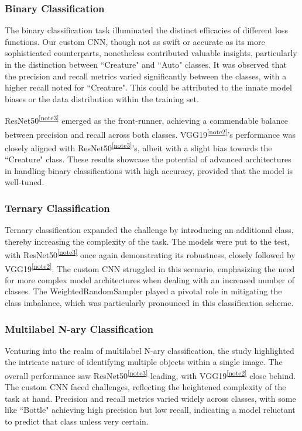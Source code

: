 \documentclass{article} %
\begin{document}
\subsubsection{Binary Classification}
The binary classification task illuminated the distinct efficacies of different loss functions. Our custom CNN, though not as swift or accurate as its more sophisticated counterparts, nonetheless contributed valuable insights, particularly in the distinction between ``Creature" and ``Auto" classes. It was observed that the precision and recall metrics varied significantly between the classes, with a higher recall noted for ``Creature". This could be attributed to the innate model biases or the data distribution within the training set.


ResNet50\textsuperscript{\ref{note3}} emerged as the front-runner, achieving a commendable balance between precision and recall across both classes. VGG19\textsuperscript{\ref{note2}}'s performance was closely aligned with ResNet50\textsuperscript{\ref{note3}}'s, albeit with a slight bias towards the ``Creature" class. These results showcase the potential of advanced architectures in handling binary classifications with high accuracy, provided that the model is well-tuned.


\subsubsection{Ternary Classification}
Ternary classification expanded the challenge by introducing an additional class, thereby increasing the complexity of the task. The models were put to the test, with ResNet50\textsuperscript{\ref{note3}} once again demonstrating its robustness, closely followed by VGG19\textsuperscript{\ref{note2}}. The custom CNN struggled in this scenario, emphasizing the need for more complex model architectures when dealing with an increased number of classes. The WeightedRandomSampler played a pivotal role in mitigating the class imbalance, which was particularly pronounced in this classification scheme.


\subsubsection{Multilabel N-ary Classification}
Venturing into the realm of multilabel N-ary classification, the study highlighted the intricate nature of identifying multiple objects within a single image. The overall performance saw ResNet50\textsuperscript{\ref{note3}} leading, with VGG19\textsuperscript{\ref{note2}} close behind. The custom CNN faced challenges, reflecting the heightened complexity of the task at hand. Precision and recall metrics varied widely across classes, with some like ``Bottle" achieving high precision but low recall, indicating a model reluctant to predict that class unless very certain.
\end{document}
